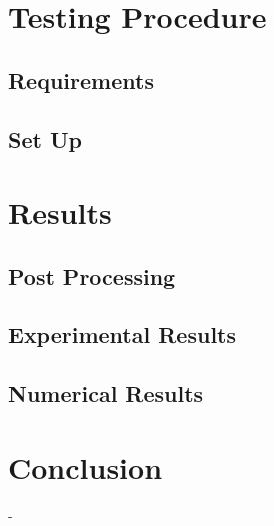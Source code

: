 \documentclass{IEEEtran}
\begin{document}
    \section{Testing Procedure}

    \subsection{Requirements}

    \subsection{Set Up}
	
	\section{Results}

    \subsection{Post Processing}


    \subsection{Experimental Results}
    

    \subsection{Numerical Results}

	
	\section{Conclusion}

 -
	
	\newpage
    \printbibliography
	
\end{document}
